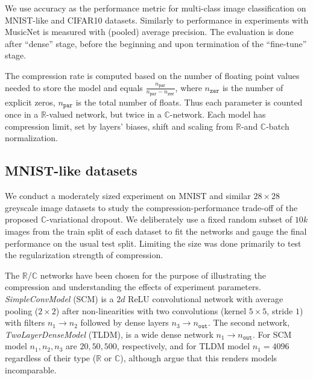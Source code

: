 \documentclass[a4paper,10pt]{article}
\newcommand{\real}{\mathbb{R}}
\newcommand{\cplx}{\mathbb{C}}
\begin{document}
We use accuracy as the performance metric for multi-class image classification on MNIST-like
and CIFAR10 datasets. Similarly to \citet{trabelsi_deep_2017} performance in experiments with
MusicNet is measured with (pooled) average precision. The evaluation is done after ``dense''
stage, before the beginning and upon termination of the ``fine-tune'' stage.

The compression rate is computed based on the number of floating point values needed to
store the model and equals $
  \tfrac{n_\mathtt{par}}{n_\mathtt{par} - n_\mathtt{zer}}
$, where $n_\mathtt{zer}$ is the number of explicit zeros, $n_\mathtt{par}$ is the total
number of floats. Thus each parameter is counted once in a $\real$-valued network, but twice
in a $\cplx$-network. Each model has compression limit, set by layers' biases, shift
and scaling from $\real$-and $\cplx$-batch normalization.



\subsection{MNIST-like datasets} %
\label{sub:mnist_like_datasets}

We conduct a moderately sized experiment on MNIST and similar $28\times 28$ greyscale image
datasets to study the compression-performance trade-off of the proposed $\cplx$-variational
dropout.
We deliberately use a {fixed} random subset of $10k$ images from the train split of each
dataset to fit the networks and gauge the final performance on the usual test split.
Limiting the size was done primarily to test the regularization strength of compression.

The $\real$/$\cplx$ networks have been chosen for the purpose of illustrating the compression
and understanding the effects of experiment parameters. \textit{SimpleConvModel} (SCM) is a $2d$
ReLU convolutional network with average pooling ($2\times 2$) after non-linearities with
two convolutions (kernel $5\times 5$, stride $1$) with filters $n_1 \to n_2$ followed by
dense layers $n_3 \to n_\mathtt{out}$. The second network, \textit{TwoLayerDenseModel} (TLDM),
is a wide dense network $n_1 \to n_\mathtt{out}$. For SCM model $n_1, n_2, n_3$ are $20, 50, 500$,
respectively, and for TLDM model $n_1 = 4096$ regardless of their type ($\real$ or $\cplx$),
although \citet{monning_evaluation_2018} argue that this renders models incomparable.
\end{document}
